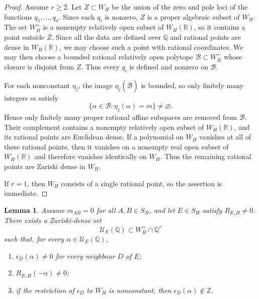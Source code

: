 \documentclass[12pt]{amsart}
\numberwithin{equation}{section}
\theoremstyle{plain}
\newtheorem{lemma}[theorem]{Lemma}
\theoremstyle{definition}
\theoremstyle{remark}
\theoremstyle{definition}
\newcommand{\Q}{\mathbb Q}
\newcommand{\R}{\mathbb R}
\newcommand{\Z}{\mathbb Z}
\begin{document}
\begin{proof}
Assume $r\ge2$. Let $Z\subset W_H$ be the union of the zero and pole loci of the functions $q_1,\ldots,q_a$. Since each $q_i$ is nonzero, $Z$ is a proper algebraic subset of $W_H$. The set $W_H^+$ is a nonempty relatively open subset of $W_H(\R)$, so it contains a point outside $Z$. Since all the data are defined over $\Q$ and rational points are dense in $W_H(\R)$, we may choose such a point with rational coordinates. We may then choose a bounded rational relatively open polytope $\mathcal B\subset W_H^+$ whose closure is disjoint from $Z$. Thus every $q_i$ is defined and nonzero on $\mathcal B$.

For each nonconstant $\eta_j$, the image $\eta_j(\overline{\mathcal B})$ is bounded, so only finitely many integers $m$ satisfy
\begin{equation*}
\{\alpha\in\mathcal B:\eta_j(\alpha)=m\}\neq\varnothing.
\end{equation*}
Hence only finitely many proper rational affine subspaces are removed from $\mathcal B$. Their complement contains a nonempty relatively open subset of $W_H(\R)$, and its rational points are Euclidean dense. If a polynomial on $W_H$ vanishes at all of these rational points, then it vanishes on a nonempty real open subset of $W_H(\R)$ and therefore vanishes identically on $W_H$. Thus the remaining rational points are Zariski dense in $W_H$.

If $r=1$, then $W_H$ consists of a single rational point, so the assertion is immediate.
\end{proof}



\begin{lemma}\label{lem:selected-rupture-density}
Assume $m_{AB}=0$ for all $A,B\in S_H$, and let $E\in S_H$ satisfy $R_{E,H}\neq0$. There exists a Zariski-dense set
\begin{equation*}
\mathcal U_E(\Q)\subset W_H^+\cap\Q^r
\end{equation*}
such that, for every $\alpha\in\mathcal U_E(\Q)$,
\begin{enumerate}[label=\textup{(\roman*)}]
\item $\epsilon_D(\alpha)\neq0$ for every neighbour $D$ of $E$;
\item $R_{E,H}(-\alpha)\neq0$;
\item if the restriction of $\epsilon_D$ to $W_H$ is nonconstant, then $\epsilon_D(\alpha)\notin\Z$.
\end{enumerate}
\end{lemma}
\end{document}
